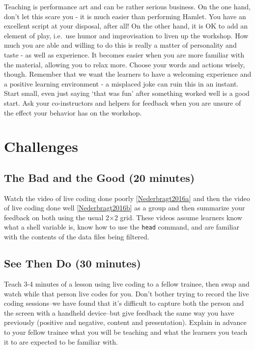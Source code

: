 \documentclass[10pt,statementpaper]{memoir}
\begin{document}
Teaching is performance art and can be rather serious business. On the
one hand, don't let this scare you - it is much easier than performing
Hamlet. You have an excellent script at your disposal, after all! On the
other hand, it is OK to add an element of play, i.e.~use humor and
improvisation to liven up the workshop. How much you are able and
willing to do this is really a matter of personality and taste - as well
as experience. It becomes easier when you are more familiar with the
material, allowing you to relax more. Choose your words and actions
wisely, though. Remember that we want the learners to have a welcoming
experience and a positive learning environment - a misplaced joke can
ruin this in an instant. Start small, even just saying `that was fun'
after something worked well is a good start. Ask your co-instructors and
helpers for feedback when you are unsure of the effect your behavior has
on the workshop.

\section{Challenges}\label{challenges-7}

\subsection*{The Bad and the Good (20
minutes)}\label{the-bad-and-the-good-20-minutes}

Watch the video of live coding done poorly
{[}\href{biblio.html\#live-coding-bad}{Nederbragt2016a}{]} and then the
video of live coding done well
{[}\href{biblio.html\#live-coding-good}{Nederbragt2016b}{]} as a group
and then summarize your feedback on both using the usual 2×2 grid. These
videos assume learners know what a shell variable is, know how to use
the \texttt{head} command, and are familiar with the contents of the
data files being filtered.

\subsection*{See Then Do (30 minutes)}\label{see-then-do-30-minutes}

Teach 3-4 minutes of a lesson using live coding to a fellow trainee,
then swap and watch while that person live codes for you. Don't bother
trying to record the live coding sessions--we have found that it's
difficult to capture both the person and the screen with a handheld
device--but give feedback the same way you have previously (positive and
negative, content and presentation). Explain in advance to your fellow
trainee what you will be teaching and what the learners you teach it to
are expected to be familiar with.
\end{document}
